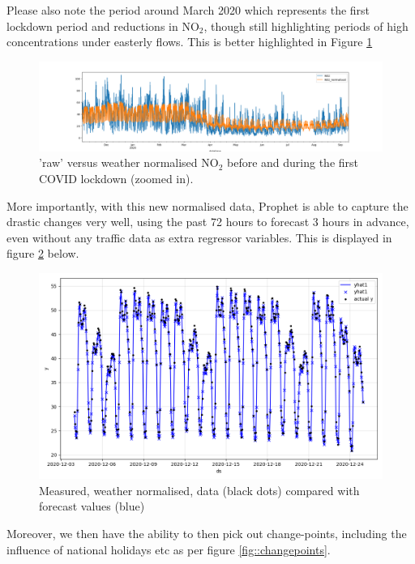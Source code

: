 \documentclass{article}
\begin{document}
\noindent Please also note the period around March 2020 which represents the first lockdown period and reductions in NO$_{2}$, though still highlighting periods of high concentrations under easterly flows. This is better highlighted in Figure \ref{fig::NO2normalised2}\\

\begin{figure}[htbp]
	\centering
	\includegraphics[width=0.95\linewidth]{Figures/NO2_raw_v_weathernorm_zoom.png}		
	\caption{'raw' versus weather normalised NO$_{2}$ before and during the first COVID lockdown (zoomed in). } \label{fig::NO2normalised2}
\end{figure}

\noindent More importantly, with this new normalised data, Prophet is able to capture the drastic changes very well, using the past 72 hours to forecast 3 hours in advance, even without any traffic data as extra regressor variables. This is displayed in figure \ref{fig::NO2normalised3} below. \\

\begin{figure}[htbp]
	\centering
	\includegraphics[width=0.95\linewidth]{Figures/forecast_1month.png}
	\caption{Measured, weather normalised, data (black dots) compared with forecast values (blue)} \label{fig::NO2normalised3}
\end{figure}

\noindent Moreover, we then have the ability to then pick out change-points, including the influence of national holidays etc as per figure \ref{fig::changepoints}.\\
\end{document}
